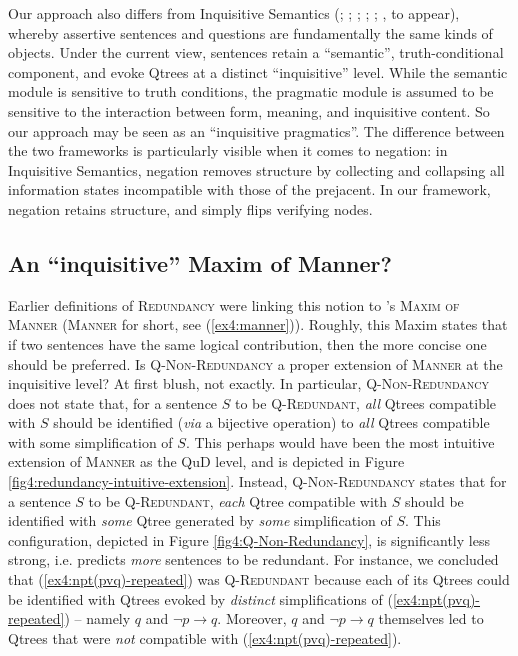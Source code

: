 Our approach also differs from Inquisitive Semantics (; ; ; ; ; \citeauthor{Zhang2024}, to appear), whereby assertive sentences and questions are fundamentally the same kinds of objects. Under the current view, sentences retain a ``semantic'', truth-conditional component, and evoke Qtrees at a distinct ``inquisitive'' level. While the semantic module is sensitive to truth conditions, the pragmatic module is assumed to be sensitive to the interaction between form, meaning, and inquisitive content. So our approach may be seen as an ``inquisitive pragmatics''. The difference between the two frameworks is particularly visible when it comes to negation: in Inquisitive Semantics, negation removes structure by collecting and collapsing all information states incompatible with those of the prejacent. In our framework, negation retains structure, and simply flips verifying nodes. 

\subsection{An ``inquisitive'' Maxim of Manner?}
Earlier definitions of \textsc{Redundancy} were linking this notion to \citeauthor{Grice1975}'s \textsc{Maxim of Manner} (\textsc{Manner} for short, see (\ref{ex4:manner})). Roughly, this Maxim states that if two sentences have the same logical contribution, then the more concise one should be preferred. Is \textsc{Q-Non-Redundancy} a proper extension of \textsc{Manner} at the inquisitive level? At first blush, not exactly. In particular, \textsc{Q-Non-Redundancy} does not state that, for a sentence $S$ to be \textsc{Q-Redundant}, \textit{all} Qtrees compatible with $S$ should be identified (\textit{via} a bijective operation) to \textit{all} Qtrees compatible with some simplification of $S$. This perhaps would have been the most intuitive extension of \textsc{Manner} as the QuD level, and is depicted in Figure \ref{fig4:redundancy-intuitive-extension}. Instead, \textsc{Q-Non-Redundancy} states that for a sentence $S$ to be \textsc{Q-Redundant}, \textit{each} Qtree compatible with $S$ should be identified with \textit{some} Qtree generated by \textit{some} simplification of $S$. This configuration, depicted in Figure \ref{fig4:Q-Non-Redundancy}, is significantly less strong, i.e. predicts \textit{more} sentences to be redundant. For instance, we concluded that (\ref{ex4:npt(pvq)-repeated}) was \textsc{Q-Redundant} because each of its Qtrees could be identified with Qtrees evoked by \textit{distinct} simplifications of (\ref{ex4:npt(pvq)-repeated}) -- namely $q$ and $\neg p \rightarrow q$. Moreover, $q$ and $\neg p \rightarrow q$ themselves led to Qtrees that were \textit{not} compatible with (\ref{ex4:npt(pvq)-repeated}).

